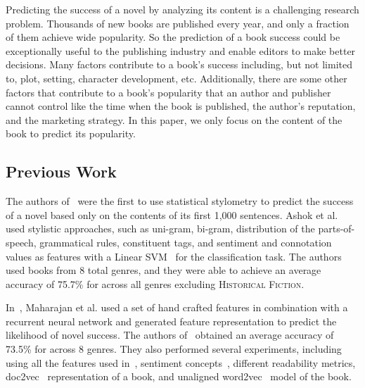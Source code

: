 Predicting the success of a novel by analyzing its content is a challenging research problem.
Thousands of new books are published every year, and only a fraction of them achieve wide popularity.
So the prediction of a book success could be exceptionally useful to the publishing industry and enable editors to make better decisions. 
Many factors contribute to a book's success including, but not limited to,
plot, setting, character development, etc.
Additionally, there are some other factors that contribute to a book's popularity that an author and publisher cannot control like the time when the book is published, the author's reputation, and the marketing strategy. 
In this paper, we only focus on the content of the book to predict its popularity. 


\subsection*{Previous Work}
The authors of~\cite{ashok2013} were the first to use statistical stylometry to predict the success of a novel based only on the contents of its first 1,000 sentences. 
Ashok et al. used stylistic approaches, such as uni-gram, bi-gram, distribution of the parts-of-speech, grammatical rules, constituent tags, and sentiment and connotation values as features with a Linear SVM~\cite{LIB} for the classification task. 
The authors used books from 8 total genres, and they were able to achieve an average accuracy of 75.7\% for across all genres excluding \textsc{Historical Fiction}. 

In~\cite{maharjan_multitask}, Maharajan et al. used a set of hand crafted features in combination with a recurrent neural network and generated feature representation to predict the likelihood of novel success.
The authors of~\cite{maharjan_multitask} obtained an average accuracy of 73.5\% for across 8 genres.
They also performed several experiments, including using all the features used in~\cite{ashok2013}, sentiment concepts~\cite{Senticnet}, different readability metrics, doc2vec~\cite{Doc2Vec} representation of a book, and unaligned word2vec~\cite{Word2Vec} model of the book. 


